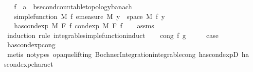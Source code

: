 \begin{isabellebody}
\ \ \ f\ {\isacharcolon}{\kern0pt}{\isacharcolon}{\kern0pt}\ {\isachardoublequoteopen}{\isacharprime}{\kern0pt}a\ {\isasymRightarrow}\ {\isacharprime}{\kern0pt}b{\isacharcolon}{\kern0pt}{\isacharcolon}{\kern0pt}{\isacharbraceleft}{\kern0pt}second{\isacharunderscore}{\kern0pt}countable{\isacharunderscore}{\kern0pt}topology{\isacharcomma}{\kern0pt}banach{\isacharbraceright}{\kern0pt}{\isachardoublequoteclose}\isanewline
\ \ \ {\isachardoublequoteopen}simple{\isacharunderscore}{\kern0pt}function\ M\ f{\isachardoublequoteclose}\ {\isachardoublequoteopen}emeasure\ M\ {\isacharbraceleft}{\kern0pt}y\ {\isasymin}\ space\ M{\isachardot}{\kern0pt}\ f\ y\ {\isasymnoteq}\ {}{\isacharbraceright}{\kern0pt}\ {\isasymnoteq}\ {\isasyminfinity}{\isachardoublequoteclose}\isanewline
\ \ \ {\isachardoublequoteopen}has{\isacharunderscore}{\kern0pt}cond{\isacharunderscore}{\kern0pt}exp\ M\ F\ f\ {\isacharparenleft}{\kern0pt}cond{\isacharunderscore}{\kern0pt}exp\ M\ F\ f{\isacharparenright}{\kern0pt}{\isachardoublequoteclose}\isanewline
%
\isadelimproof
\ \ %
\endisadelimproof
%
\isatagproof
{}\isamarkupfalse%
\ assms\isanewline
{}\isamarkupfalse%
\ {\isacharparenleft}{\kern0pt}induction\ rule{\isacharcolon}{\kern0pt}\ integrable{\isacharunderscore}{\kern0pt}simple{\isacharunderscore}{\kern0pt}function{\isacharunderscore}{\kern0pt}induct{\isacharparenright}{\kern0pt}\isanewline
\ \ \isamarkupfalse%
\ {\isacharparenleft}{\kern0pt}cong\ f\ g{\isacharparenright}{\kern0pt}\isanewline
\ \ \isamarkupfalse%
\ \isamarkupfalse%
\ {\isacharquery}{\kern0pt}case\ \isamarkupfalse%
\ has{\isacharunderscore}{\kern0pt}cond{\isacharunderscore}{\kern0pt}exp{\isacharunderscore}{\kern0pt}cong\ \isamarkupfalse%
\ {\isacharparenleft}{\kern0pt}metis\ {\isacharparenleft}{\kern0pt}no{\isacharunderscore}{\kern0pt}types{\isacharcomma}{\kern0pt}\ opaque{\isacharunderscore}{\kern0pt}lifting{\isacharparenright}{\kern0pt}\ Bochner{\isacharunderscore}{\kern0pt}Integration{\isachardot}{\kern0pt}integrable{\isacharunderscore}{\kern0pt}cong\ has{\isacharunderscore}{\kern0pt}cond{\isacharunderscore}{\kern0pt}expD{\isacharparenleft}{\kern0pt}{}{\isacharparenright}{\kern0pt}\ has{\isacharunderscore}{\kern0pt}cond{\isacharunderscore}{\kern0pt}exp{\isacharunderscore}{\kern0pt}charact{\isacharparenleft}{\kern0pt}{}{\isacharparenright}{\kern0pt}{\isacharparenright}{\kern0pt}\isanewline
{}\isamarkupfalse%

\end{isabellebody}
